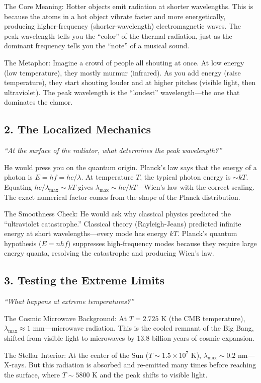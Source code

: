 \documentclass[11pt,openright]{book}
\begin{document}
The Core Meaning: Hotter objects emit radiation at shorter wavelengths. This is because the atoms in a hot object vibrate faster and more energetically, producing higher-frequency (shorter-wavelength) electromagnetic waves. The peak wavelength tells you the ``color'' of the thermal radiation, just as the dominant frequency tells you the ``note'' of a musical sound.

The Metaphor: Imagine a crowd of people all shouting at once. At low energy (low temperature), they mostly murmur (infrared). As you add energy (raise temperature), they start shouting louder and at higher pitches (visible light, then ultraviolet). The peak wavelength is the ``loudest'' wavelength---the one that dominates the clamor.

\subsection*{2. The Localized Mechanics}
\textit{``At the surface of the radiator, what determines the peak wavelength?''}

He would press you on the quantum origin. Planck's law says that the energy of a photon is $E = hf = hc/\lambda$. At temperature $T$, the typical photon energy is $\sim kT$. Equating $hc/\lambda_{\max} \sim kT$ gives $\lambda_{\max} \sim hc/kT$---Wien's law with the correct scaling. The exact numerical factor comes from the shape of the Planck distribution.

The Smoothness Check: He would ask why classical physics predicted the ``ultraviolet catastrophe.'' Classical theory (Rayleigh-Jeans) predicted infinite energy at short wavelengths---every mode has energy $kT$. Planck's quantum hypothesis ($E = nhf$) suppresses high-frequency modes because they require large energy quanta, resolving the catastrophe and producing Wien's law.

\subsection*{3. Testing the Extreme Limits}
\textit{``What happens at extreme temperatures?''}

The Cosmic Microwave Background: At $T = 2.725$ K (the CMB temperature), $\lambda_{\max} \approx 1$ mm---microwave radiation. This is the cooled remnant of the Big Bang, shifted from visible light to microwaves by 13.8 billion years of cosmic expansion.

The Stellar Interior: At the center of the Sun ($T \sim 1.5 \times 10^7$ K), $\lambda_{\max} \sim 0.2$ nm---X-rays. But this radiation is absorbed and re-emitted many times before reaching the surface, where $T \sim 5800$ K and the peak shifts to visible light.
\end{document}
